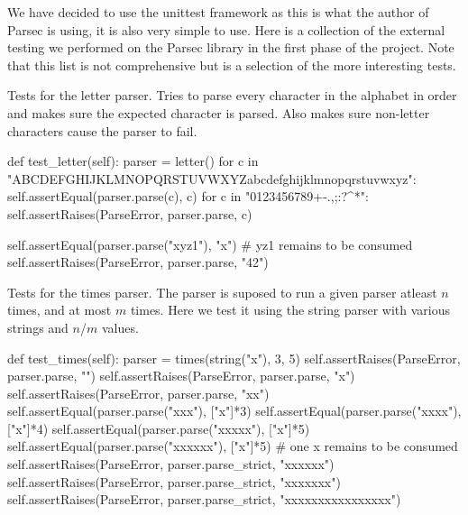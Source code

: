 We have decided to use the unittest\cite{unittest} framework as this is what the author of Parsec is using, it is also very simple to use. Here is a collection of the external testing we performed on the Parsec library in the first phase of the project. Note that this list is not comprehensive but is a selection of the more interesting tests.\par
Tests for the letter parser. Tries to parse every character in the alphabet in order and makes sure the expected character is parsed.
Also makes sure non-letter characters cause the parser to fail.
\renewcommand{\lstlistingname}{Test}
\begin{python}[caption={Test case for the parser \textit{letter}.}, label=test1]
def test_letter(self):
    parser = letter()
    for c in "ABCDEFGHIJKLMNOPQRSTUVWXYZabcdefghijklmnopqrstuvwxyz":
        self.assertEqual(parser.parse(c), c)
    for c in "0123456789+-.,;:?^*":
        self.assertRaises(ParseError, parser.parse, c)

    self.assertEqual(parser.parse("xyz1"), "x") # yz1 remains to be consumed
    self.assertRaises(ParseError, parser.parse, "42")
\end{python}


Tests for the times parser. The parser is suposed to run a given parser atleast $n$ times, and at most $m$ times. Here we test it using the string parser with various strings and $n$/$m$ values.
\begin{python}[caption={Test case for the parser \textit{times}.}, label=test2]
def test_times(self):
    parser = times(string("x"), 3, 5)
    self.assertRaises(ParseError, parser.parse, "")
    self.assertRaises(ParseError, parser.parse, "x")
    self.assertRaises(ParseError, parser.parse, "xx")
    self.assertEqual(parser.parse("xxx"), ["x"]*3)
    self.assertEqual(parser.parse("xxxx"), ["x"]*4)
    self.assertEqual(parser.parse("xxxxx"), ["x"]*5)
    self.assertEqual(parser.parse("xxxxxx"), ["x"]*5) # one x remains to be consumed
    self.assertRaises(ParseError, parser.parse_strict, "xxxxxx")
    self.assertRaises(ParseError, parser.parse_strict, "xxxxxxx")
    self.assertRaises(ParseError, parser.parse_strict, "xxxxxxxxxxxxxxxx")
\end{python}


